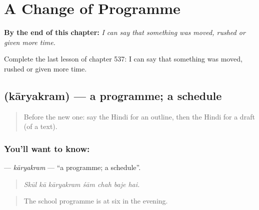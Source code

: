 
\chapter{A Change of Programme}
\label{ch:hi-a-change-of-programme}

\begin{chapteropening}
\textbf{By the end of this chapter:} \emph{I can say that something was moved, rushed or given more time.}

Complete the last lesson of chapter 537: I can say that something was moved, rushed or given more time.
\end{chapteropening}

\section[\texorpdfstring{\hi{कार्यक्रम} (kāryakram)}{कार्यक्रम (kāryakram)}]{ (kāryakram) — a programme; a schedule}

\label{lesson:HI-C537-karyakram}



\begin{quote}
Before the new one: say the Hindi for an outline, then the Hindi for a draft (of a text).
\end{quote}

\subsection*{You'll want to know: }
\textbf{} — \emph{kāryakram} — \textquotedblleft{}a programme; a schedule\textquotedblright{}.

\begin{quote}
      
\end{quote}

\begin{quote}
\emph{Skūl kā kāryakram śām chah baje hai.}
\end{quote}

\begin{quote}
The school programme is at six in the evening.
\end{quote}

